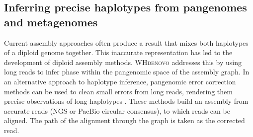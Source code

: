 %

\subsection{Inferring precise haplotypes from pangenomes and metagenomes}


Current assembly approaches often produce a result that mixes both haplotypes of a diploid genome together.
This inaccurate representation has led to the development of diploid assembly methods.
\textsc{WHdenovo} \cite{garg2018graph} addresses this by using long reads to infer phase within the pangenomic space of the assembly graph.
In an alternative approach to haplotype inference, pangenomic error correction methods can be used to clean small errors from long reads, rendering them precise observations of long haplotypes \cite{Salmela2016LORMA,Rautiainen_2019b}.
These methods build an assembly from accurate reads (NGS or PacBio circular consensus), to which reads can be aligned.
The path of the alignment through the graph is taken as the corrected read.


